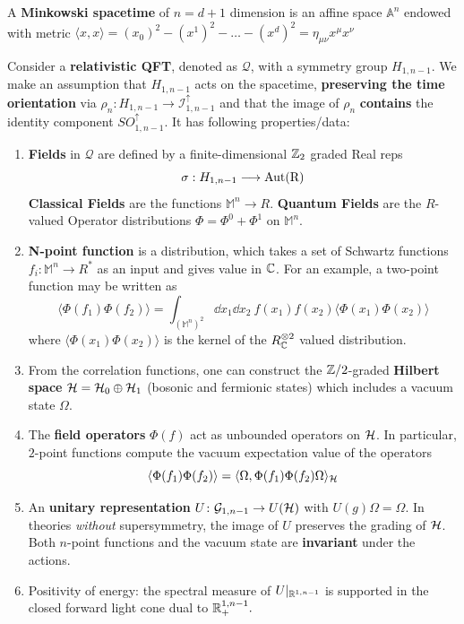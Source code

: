 \documentclass[a4paper,11pt]{article}
\begin{document}
\begin{definition}
    A {\bf Minkowski spacetime} of $n=d+1$ dimension is an affine space $\mathbb{A}^n$ endowed with metric $\langle x, x\rangle =(x_0)^2-(x^1)^2-\dots -(x^d)^2=\eta_{\mu\nu}x^\mu x^\nu$
\end{definition}

Consider a {\bf relativistic QFT}, denoted as ${\mathcal{Q}}$, with a symmetry group $H_{1,n-1}$. We make an assumption that $H_{1,n-1}$ acts on the spacetime, {\bf preserving the time orientation} via $\rho_n:H_{1,n-1}\longrightarrow \mathcal{I}^{\uparrow}_{1,n-1}$ and that the image of $\rho_n$ {\bf contains} the identity component $SO^{\uparrow}_{1,n-1}$. It has following properties/data:
\begin{enumerate}
    \item {\bf Fields} in ${\mathcal{Q}}$ are defined by a finite-dimensional $\mathbb{Z}_2$ graded Real reps
    \begin{equation}
        \sigma: H_{1,n-1}\longrightarrow {\rm Aut (R)} 
    \end{equation}
    {\bf Classical Fields} are the functions ${\mathbb M}^n \longrightarrow R$. {\bf Quantum Fields} are the $R$-valued Operator distributions $\Phi=\Phi^0+\Phi^1$ on ${\mathbb M}^n$.
    \item {\bf N-point function} is a distribution, which takes a set of Schwartz functions $f_i:{\mathbb M}^n\longrightarrow R^*$ as an input and gives value in $\mathbb{C}$. For an example, a two-point function may be written as 
    \begin{equation}
        \langle \Phi(f_1)\Phi(f_2)\rangle = \int_{({\mathbb M}^n)^2}\dd x_1 \dd x_2~f(x_1)f(x_2)\langle \Phi (x_1)\Phi(x_2)\rangle
    \end{equation}
    where $\langle \Phi (x_1)\Phi(x_2)\rangle$ is the kernel of the $R_{\mathbb{C}}^{\otimes 2}$ valued distribution. 
    \item From the correlation functions, one can construct the $\mathbb{Z}/2$-graded {\bf Hilbert space} $\mathcal{H} = \mathcal{H}_0 \oplus \mathcal{H}_1$ (bosonic and fermionic states) which includes a vacuum state $\Omega$.
    \item The {\bf field operators} $\Phi(f)$ act as unbounded operators on $\mathcal{H}$. In particular, $2$-point functions compute the vacuum expectation value of the operators
    \begin{equation}
        \langle \Phi(f_1)\Phi(f_2)\rangle = \langle \Omega, \Phi(f_1)\Phi(f_2)\Omega\rangle_{\mathcal{H}}
    \end{equation}
    \item An {\bf unitary representation} $U \colon {\mathcal G}_{1,n-1} \to U(\mathcal{H})$ with $U(g) \Omega = \Omega$. In theories {\it without} supersymmetry, the image of $U$ preserves the grading of $\mathcal{H}$. Both $n$-point functions and the vacuum state are {\bf invariant} under the actions.
    \item Positivity of energy: the spectral measure of $U|_{\mathbb{R}^{1,n-1}}$ is supported in the closed forward light cone dual to $\mathbb{R}^{1,n-1}_+.$
\end{enumerate}
\end{document}
